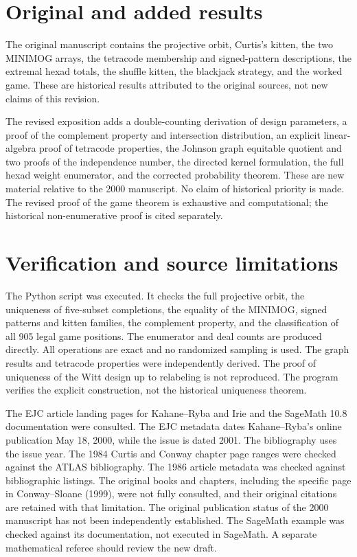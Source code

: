 \documentclass[12pt,letterpaper]{article}
\begin{document}
\section{Original and added results}
The original manuscript contains the projective orbit, Curtis's kitten, the two MINIMOG arrays, the tetracode membership and signed-pattern descriptions, the extremal hexad totals, the shuffle kitten, the blackjack strategy, and the worked game. These are historical results attributed to the original sources, not new claims of this revision.

The revised exposition adds a double-counting derivation of design parameters, a proof of the complement property and intersection distribution, an explicit linear-algebra proof of tetracode properties, the Johnson graph equitable quotient and two proofs of the independence number, the directed kernel formulation, the full hexad weight enumerator, and the corrected probability theorem. These are new material relative to the 2000 manuscript. No claim of historical priority is made. The revised proof of the game theorem is exhaustive and computational; the historical non-enumerative proof is cited separately.
\section{Verification and source limitations}
The Python script was executed. It checks the full projective orbit, the uniqueness of five-subset completions, the equality of the MINIMOG, signed patterns and kitten families, the complement property, and the classification of all 905 legal game positions. The enumerator and deal counts are produced directly. All operations are exact and no randomized sampling is used. The graph results and tetracode properties were independently derived. The proof of uniqueness of the Witt design up to relabeling is not reproduced. The program verifies the explicit construction, not the historical uniqueness theorem.

The EJC article landing pages for Kahane--Ryba and Irie and the SageMath 10.8 documentation were consulted. The EJC metadata dates Kahane--Ryba's online publication May 18, 2000, while the issue is dated 2001. The bibliography uses the issue year. The 1984 Curtis and Conway chapter page ranges were checked against the ATLAS bibliography. The 1986 article metadata was checked against bibliographic listings. The original books and chapters, including the specific page in Conway--Sloane (1999), were not fully consulted, and their original citations are retained with that limitation. The original publication status of the 2000 manuscript has not been independently established. The SageMath example was checked against its documentation, not executed in SageMath. A separate mathematical referee should review the new draft.
\end{document}
